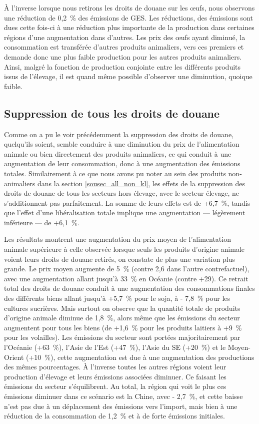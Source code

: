 À l'inverse lorsque nous retirons les droits de douane sur les œufs, nous observons une réduction de 0,2~\% des émissions de GES. Les réductions, des émissions sont dues cette fois-ci à une réduction plus importante de la production dans certaines régions d'une augmentation dans d'autres. Les prix des œufs ayant diminué, la consommation est transférée d'autres produits animaliers, vers ces premiers et demande donc une plus faible production pour les autres produits animaliers. Ainsi, malgré la fonction de production conjointe entre les différents produits issus de l'élevage, il est quand même possible d'observer une diminution, quoique faible.


\subsection{Suppression de tous les droits de douane}

Comme on a pu le voir précédemment la suppression des droits de douane, quelqu'ils soient, semble conduire à une diminution du prix de l'alimentation animale ou bien directement des produits animaliers, ce qui conduit à une augmentation de leur consommation, donc à une augmentation des émissions totales. Similairement à ce que nous avons pu noter au sein des produits non-animaliers dans la section \ref{sousec_all_non_kl}, les effets de la suppression des droits de douane de tous les secteurs hors élevage, avec le secteur élevage, ne s'additionnent pas parfaitement. La somme de leurs effets est de +6,7~\%, tandis que l'effet d'une libéralisation totale implique une augmentation — légèrement inférieure — de +6,1~\%.

Les résultats montrent une augmentation du prix moyen de l'alimentation animale supérieure à celle observée lorsque seuls les produits d'origine animale voient leurs droits de douane retirés, on constate de plus une variation plus grande. Le prix moyen augmente de 5~\% (contre 2,6 dans l'autre contrefactuel), avec une augmentation allant jusqu'à 33~\% en Océanie (contre +29). Ce retrait total des droits de douane conduit à une augmentation des consommations finales des différents biens allant jusqu'à +5,7~\% pour le soja, à - 7,8~\% pour les cultures sucrières. Mais surtout on observe que la quantité totale de produits d'origine animale diminue de 1,8~\%, alors même que les émissions du secteur augmentent pour tous les biens (de +1,6~\% pour les produits laitiers à +9~\% pour les volailles). Les émissions du secteur sont portées majoritairement par l'Océanie (+63~\%), l'Asie de l'Est (+47~\%), l'Asie du SE (+20~\%) et le Moyen-Orient (+10~\%), cette augmentation est due à une augmentation des productions des mêmes pourcentages. À l'inverse toutes les autres régions voient leur production d'élevage et leurs émissions associées diminuer. Ce faisant les émissions du secteur s'équilibrent. Au total, la région qui voit le plus ces émissions diminuer dans ce scénario est la Chine, avec - 2,7~\%, et cette baisse n'est pas due à un déplacement des émissions vers l'import, mais bien à une réduction de la consommation de 1,2~\% et à de forte émissions initiales.


